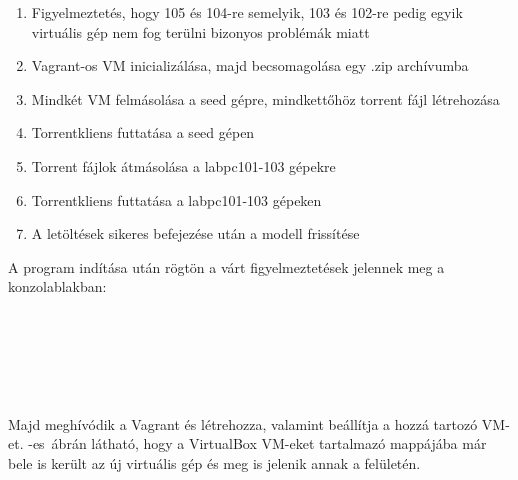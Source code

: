 \begin{enumerate}
  \item Figyelmeztetés, hogy 105 és 104-re semelyik, 103 és 102-re pedig egyik virtuális gép nem fog terülni bizonyos problémák miatt
  \item Vagrant-os VM inicializálása, majd becsomagolása egy .zip archívumba
  \item Mindkét VM felmásolása a seed gépre, mindkettőhöz torrent fájl létrehozása
  \item Torrentkliens futtatása a seed gépen
  \item Torrent fájlok átmásolása a labpc101-103 gépekre
  \item Torrentkliens futtatása a labpc101-103 gépeken
  \item A letöltések sikeres befejezése után a modell frissítése
\end{enumerate}

A program indítása után rögtön a várt figyelmeztetések jelennek meg a konzolablakban:\\\\
\\
\\
\\
\\\\
Majd meghívódik a Vagrant és létrehozza, valamint beállítja a hozzá tartozó VM-et. -es~ábrán látható, hogy a VirtualBox VM-eket tartalmazó mappájába már bele is került az új virtuális gép és meg is jelenik annak a felületén.

